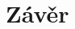 \documentclass[a4paper,11pt,titlepage,fleqn]{article}
\begin{document}
\newpage
\section{Závěr}

\newpage
\begin{thebibliography}{99}



\end{thebibliography}



\end{document}
